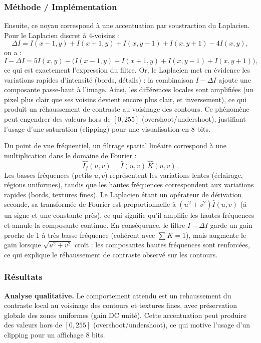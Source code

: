 \documentclass[11pt,a4paper]{article}
\begin{document}
\subsubsection{Méthode / Implémentation}
Ensuite, ce noyau correspond \`a une accentuation par soustraction du Laplacien. Pour le Laplacien discret \`a 4-voisins :
\[
\Delta I = I(x\!-\!1,y)+I(x\!+\!1,y)+I(x,y\!-\!1)+I(x,y\!+\!1)-4I(x,y),
\]
on a :
\[
I-\Delta I = 5I(x,y)-\big(I(x\!-\!1,y)+I(x\!+\!1,y)+I(x,y\!-\!1)+I(x,y\!+\!1)\big),
\]
ce qui est exactement l'expression du filtre. Or, le Laplacien met en \'evidence les variations rapides d'intensit\'e (bords, d\'etails) : la combinaison \(I-\Delta I\) ajoute une composante passe-haut \`a l'image. Ainsi, les diff\'erences locales sont amplifi\'ees (un pixel plus clair que ses voisins devient encore plus clair, et inversement), ce qui produit un r\'ehaussement de contraste au voisinage des contours. Ce ph\'enom\`ene peut engendrer des valeurs hors de \([0,255]\) (overshoot/undershoot), justifiant l'usage d'une saturation (clipping) pour une visualisation en 8 bits.

Du point de vue fr\'equentiel, un filtrage spatial lin\'eaire correspond \`a une multiplication dans le domaine de Fourier :
\[
\widehat{I_f}(u,v)=\widehat{I}(u,v)\,\widehat{K}(u,v).
\]
Les basses fr\'equences (petits \(u,v\)) repr\'esentent les variations lentes (\'eclairage, r\'egions uniformes), tandis que les hautes fr\'equences correspondent aux variations rapides (bords, textures fines). Le Laplacien \'etant un op\'erateur de d\'erivation seconde, sa transform\'ee de Fourier est proportionnelle \`a \((u^2+v^2)\widehat{I}(u,v)\) (\'a un signe et une constante pr\`es), ce qui signifie qu'il amplifie les hautes fr\'equences et annule la composante continue. En cons\'equence, le filtre \(I-\Delta I\) garde un gain proche de 1 \`a tr\`es basse fr\'equence (coh\'erent avec \(\sum K = 1\)), mais augmente le gain lorsque \(\sqrt{u^2+v^2}\) cro\^it : les composantes hautes fr\'equences sont renforc\'ees, ce qui explique le r\'ehaussement de contraste observ\'e sur les contours.

\subsubsection{Résultats}
\textbf{Analyse qualitative.}
Le comportement attendu est un rehaussement du contraste local au voisinage des contours et textures fines, avec pr\'eservation globale des zones uniformes (gain DC unit\'e). Cette accentuation peut produire des valeurs hors de \([0,255]\) (overshoot/undershoot), ce qui motive l'usage d'un clipping pour un affichage 8 bits.
\end{document}
